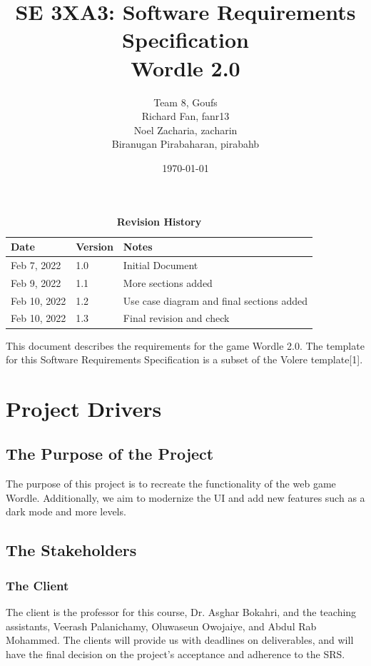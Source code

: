 \documentclass[12pt, titlepage]{article}
\title{SE 3XA3: Software Requirements Specification\\Wordle 2.0}
\author{Team 8, Goufs
	\\ Richard Fan, fanr13
	\\ Noel Zacharia, zacharin
	\\ Biranugan Pirabaharan, pirabahb
}
\date{\today}
\begin{document}
	
	\maketitle
	
	\tableofcontents
	\listoftables
	\listoffigures
	
	\begin{table}[bp]
		\caption{\bf Revision History}
		\begin{tabularx}{\textwidth}{p{3cm}p{2cm}X}
			\toprule {\bf Date} & {\bf Version} & {\bf Notes}\\
			\midrule
			Feb 7, 2022  & 1.0 & Initial Document\\
			Feb 9, 2022 & 1.1 & More sections added\\
			Feb 10, 2022 & 1.2 & Use case diagram and final sections added\\
			Feb 10, 2022 & 1.3 & Final revision and check \\
			\bottomrule
		\end{tabularx}
	\end{table}
	
	\newpage
	
	This document describes the requirements for the game Wordle 2.0. The 
	template 
	for this Software Requirements Specification is a subset of the Volere 
	template[1].
	
	
	\section{Project Drivers}
	
	\subsection{The Purpose of the Project}
	The purpose of this project is to recreate the functionality of the web 
	game Wordle. Additionally, we aim to modernize the UI and add new features 
	such as a dark mode and more levels.
	\subsection{The Stakeholders}
	
	\subsubsection{The Client}
	The client is the professor for this course, Dr. Asghar Bokahri, and the 
	teaching assistants, Veerash Palanichamy, Oluwaseun Owojaiye, and Abdul Rab 
	Mohammed. The clients will provide us with deadlines on deliverables, and 
	will 
	have the final decision on the project's acceptance and adherence to the 
	SRS. 
	
\end{document}
